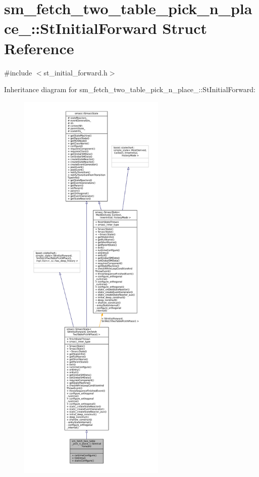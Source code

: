 \hypertarget{structsm__fetch__two__table__pick__n__place__1_1_1StInitialForward}{}\section{sm\+\_\+fetch\+\_\+two\+\_\+table\+\_\+pick\+\_\+n\+\_\+place\+\_\+:\+:St\+Initial\+Forward Struct Reference}
\label{structsm__fetch__two__table__pick__n__place__1_1_1StInitialForward}


{\ttfamily \#include $<$st\+\_\+initial\+\_\+forward.\+h$>$}



Inheritance diagram for sm\+\_\+fetch\+\_\+two\+\_\+table\+\_\+pick\+\_\+n\+\_\+place\+\_\+:\+:St\+Initial\+Forward\+:
\nopagebreak
\begin{figure}[H]
\begin{center}
\leavevmode
\includegraphics[height=550pt]{structsm__fetch__two__table__pick__n__place__1_1_1StInitialForward__inherit__graph}
\end{center}
\end{figure}


